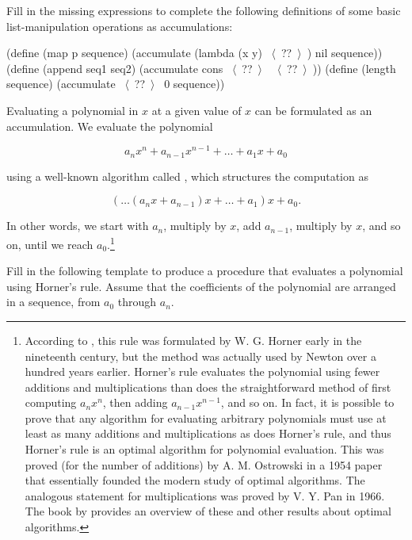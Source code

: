 \begin{exerciseGroup}
\label{Exercise 2.33}
 Fill in the missing expressions
to complete the following definitions of some basic list-manipulation
operations as accumulations:

\begin{codeBlock}
(define (map p sequence)
  (accumulate (lambda (x y) ~\(\langle \)~??~\(\rangle \)~) nil sequence))
(define (append seq1 seq2)
  (accumulate cons ~\(\langle \)~??~\(\rangle \)~ ~\(\langle \)~??~\(\rangle \)~))
(define (length sequence)
  (accumulate ~\(\langle \)~??~\(\rangle \)~ 0 sequence))
\end{codeBlock}

\label{Exercise 2.34}
 Evaluating a polynomial in \( x \)
at a given value of \( x \) can be formulated as an accumulation.  We evaluate
the polynomial

$$ a_n x^n + a_{n-1} x^{n-1} + \dots + a_1 x + a_0 $$

\noindent
using a well-known algorithm called , which structures
the computation as

$$ (\dots (a_n x + a_{n-1}) x + \dots + a_1) x + a_0. $$

\noindent
In other words, we start with \( a_n \), multiply by \( x \), add
\( a_{n-1} \), multiply by \( x \), and so on, until we reach
\( a_0 \).\footnote{According to , this rule was formulated by
W. G. Horner early in the nineteenth century, but the method was actually used
by Newton over a hundred years earlier.  Horner's rule evaluates the polynomial
using fewer additions and multiplications than does the straightforward method
of first computing \( a_n x^n \), then adding
\( a_{n-1}x^{n-1} \), and so on.  In fact, it is possible to prove
that any algorithm for evaluating arbitrary polynomials must use at least as
many additions and multiplications as does Horner's rule, and thus Horner's
rule is an optimal algorithm for polynomial evaluation.  This was proved (for
the number of additions) by A. M. Ostrowski in a 1954 paper that essentially
founded the modern study of optimal algorithms.  The analogous statement for
multiplications was proved by V. Y. Pan in 1966.  The book by 
provides an overview of these and other results about optimal
algorithms.}

Fill in the following template to produce a procedure that evaluates a
polynomial using Horner's rule.  Assume that the coefficients of the polynomial
are arranged in a sequence, from \( a_0 \) through \( a_n \).


\end{exerciseGroup}
